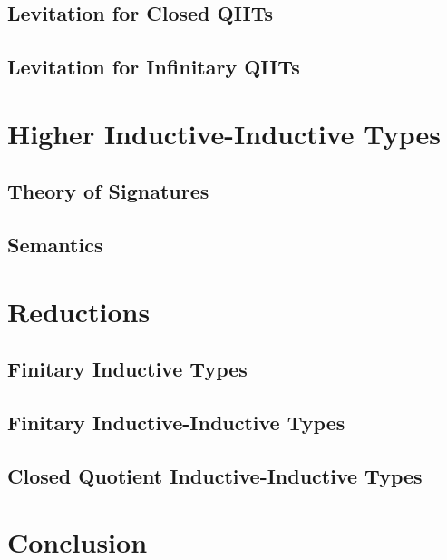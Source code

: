 \documentclass[12pt,a4paper,twoside,openany]{book}
\theoremstyle{remark}
\theoremstyle{definition}
\theoremstyle{theorem}
\begin{document}
\section{Levitation for Closed QIITs}
\section{Levitation for Infinitary QIITs}

\chapter{Higher Inductive-Inductive Types}
\label{chap:hiit}

\section{Theory of Signatures}
\section{Semantics}

\chapter{Reductions}

\section{Finitary Inductive Types}
\section{Finitary Inductive-Inductive Types}
\section{Closed Quotient Inductive-Inductive Types}

\chapter{Conclusion}


\backmatter
\end{document}
